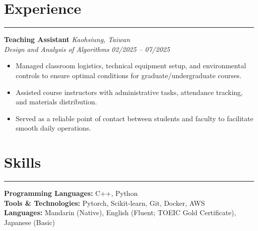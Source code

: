 \documentclass[12pt]{article}
\begin{document}
\section*{\textbf{Experience}}
\vspace{-3pt}
\hrule
\vspace{10pt}
\textbf{Teaching Assistant } \hfill \textit{Kaohsiung, Taiwan}\\
\textit{Design and Analysis of Algorithms} \hfill \textit{02/2025 -- 07/2025}
\begin{itemize}[leftmargin=16pt, topsep=2pt, itemsep=0pt]
    \item Managed classroom logistics, technical equipment setup, and environmental controls to ensure optimal conditions for graduate/undergraduate courses.
    \item Assisted course instructors with administrative tasks, attendance tracking, and materials distribution.
    \item Served as a reliable point of contact between students and faculty to facilitate smooth daily operations.
\end{itemize}

\section*{\textbf{Skills}}
\vspace{-3pt}
\hrule
\vspace{10pt}
\textbf{Programming Languages:} C++, Python\\[1pt]
\textbf{Tools \& Technologies:} Pytorch, Scikit-learn, Git, Docker, AWS\\[1pt]
\textbf{Languages:} Mandarin (Native), English (Fluent; TOEIC Gold Certificate), Japanese (Basic)

\vspace{8pt}
\end{document}
